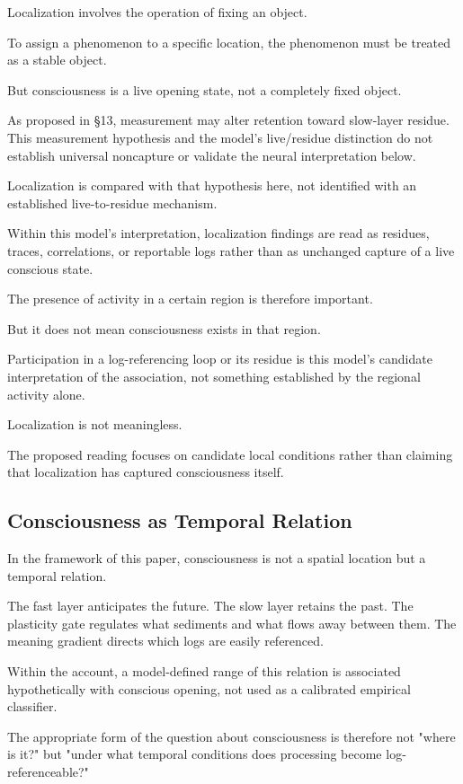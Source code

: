 Localization involves the operation of fixing an object.

To assign a phenomenon to a specific location, the phenomenon must be treated as a stable object.

But consciousness is a live opening state, not a completely fixed object.

As proposed in §13, measurement may alter retention toward slow-layer residue. This measurement hypothesis and the model's live/residue distinction do not establish universal noncapture or validate the neural interpretation below.

Localization is compared with that hypothesis here, not identified with an established live-to-residue mechanism.

Within this model's interpretation, localization findings are read as residues, traces, correlations, or reportable logs rather than as unchanged capture of a live conscious state.

The presence of activity in a certain region is therefore important.

But it does not mean consciousness exists in that region.

Participation in a log-referencing loop or its residue is this model's candidate interpretation of the association, not something established by the regional activity alone.

Localization is not meaningless.

The proposed reading focuses on candidate local conditions rather than claiming that localization has captured consciousness itself.

\subsection{Consciousness as Temporal Relation}


In the framework of this paper, consciousness is not a spatial location but a temporal relation.

The fast layer anticipates the future. The slow layer retains the past. The plasticity gate regulates what sediments and what flows away between them. The meaning gradient directs which logs are easily referenced.

Within the account, a model-defined range of this relation is associated hypothetically with conscious opening, not used as a calibrated empirical classifier.

The appropriate form of the question about consciousness is therefore not "where is it?" but "under what temporal conditions does processing become log-referenceable?"

